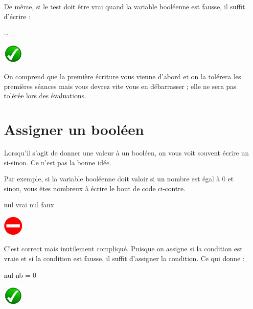 	\bigskip
	\begin{minipage}{9cm}
		De même, si le test doit être vrai quand la variable booléenne
		est fausse, il suffit d'écrire : 
	\end{minipage}
	\quad
	\begin{minipage}{4cm}	
		\begin{LDA}
			\Stmt \dots
		\EndIf
		\end{LDA}
	\end{minipage}
	\hskip-5mm
	\includegraphics[width=1cm]{icon/do}

	\bigskip
	On comprend que la première écriture vous vienne
	d'abord et on la tolérera les premières séances
	mais vous devrez vite vous en débarrasser ;
	elle ne sera pas tolérée lors des évaluations.
	
\section{Assigner un booléen}\label{B-ass-bool}

	Lorsqu'il s'agit de donner une valeur à un booléen,
	on vous voit souvent écrire un si-sinon.
	Ce n'est pas la bonne idée.

	\bigskip
	\begin{minipage}{9cm}
		Par exemple,
		si la variable booléenne \lda{nul} 
		doit valoir  si un nombre est égal à 0
		et  sinon,
		vous êtes nombreux à écrire le bout de code ci-contre.		
	\end{minipage}
	\quad
	\begin{minipage}{4cm}
		\begin{LDA}
		\If{nb = 0}
			\Let nul \Gets vrai
		\Else
			\Let nul \Gets faux
		\EndIf
		\end{LDA}
	\end{minipage}
	\hskip-5mm
	\includegraphics[width=1cm]{icon/dont}

	\bigskip
	\begin{minipage}{9cm}
		C'est correct mais inutilement compliqué.
		Puisque on assigne  si la condition
		est vraie et  si la condition est
		fausse, il suffit d'assigner la condition.
		Ce qui donne :
	\end{minipage}
	\quad
	\begin{minipage}{4cm}
		\begin{LDA}
		\Let nul \Gets nb = 0
		\end{LDA}
	\end{minipage}
	\hskip-5mm
	\includegraphics[width=1cm]{icon/do}

